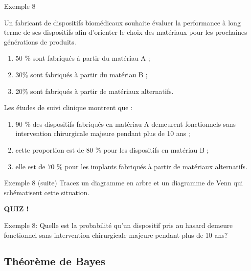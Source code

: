 \documentclass{BeamerTemplate}
\begin{document}
\begin{frame}[t]{Exemple 8}

{\footnotesize Un fabricant de dispositifs biomédicaux souhaite évaluer la performance à long terme de ses dispositifs afin d’orienter le choix des matériaux pour les prochaines générations de produits.
\begin{enumerate}[$\bullet$]
\item 50 \% sont fabriqués à partir du matériau A ;
\item 30\% sont fabriqués à partir du matériau B ;
\item 20\% sont fabriqués à partir de matériaux alternatifs.
\end{enumerate}

Les études de suivi clinique montrent que :
\begin{enumerate}[$\bullet$]
\item 90 \% des dispositifs fabriqués en matériau A demeurent fonctionnels sans intervention chirurgicale majeure pendant plus de 10 ans ;
\item cette proportion est de 80 \% pour les dispositifs en matériau B ;
\item elle est de 70 \% pour les implants fabriqués à partir de matériaux alternatifs.
\end{enumerate}





    
}
\end{frame}

\begin{frame}[t]{Exemple 8 (suite)}
Tracez un diagramme en arbre et un diagramme de Venn qui schématisent cette situation.
 \vspace{7cm}
\end{frame}

\begin{frame}[plain,t]%


\centerline{\LARGE\bf\alert{QUIZ !}}
Exemple 8: Quelle est la probabilité qu'un dispositif pris au hasard demeure fonctionnel sans intervention chirurgicale majeure pendant plus de 10 ans?

 \vspace{5.6cm}

\end{frame}

\subsection{Théorème de Bayes}
\end{document}
